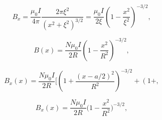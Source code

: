\documentclass[5p]{elsarticle}	            	%
\begin{document}
\begin{equation}
	B_x = {\frac{\mu_0 I}{4\pi}} {\frac{2\pi\xi^2}{\left(x^2+\xi^2\right)^{3/2}}} = {\frac{\mu_0 I}{2\xi} \left(1-\frac{x^2}{\xi^2}\right)^{-3/2}},\label{biot} 
\end{equation}

\begin{equation}
	B(x) = {\frac{N \mu_0 I}{2R}}\left(1-\frac{x^2}{R^2}\right)^{-3/2}
	,\label{biot} 
\end{equation}

\begin{equation}
	B_x(x) = {\frac{N \mu_0 I}{2R}}[\left(1+\frac{(x-a/2)^2}{R^2}\right)^{-3/2} + \left(1+
	,\label{biot} 
\end{equation}

\begin{equation}
	B_x(x) = {\frac{N \mu_0 I}{2R}}(1-{\frac{x^2}{R^2})^{-3/2}}
	,\label{biot}
\end{equation}
\end{document}
